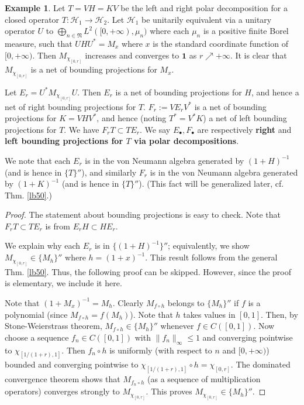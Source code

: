 \documentclass[12pt,b5paper,notitlepage]{article}
\theoremstyle{definition}
\newtheorem{eg}[df]{Example}
\theoremstyle{plain}
\newcommand{\fk}{\mathfrak}
\newcommand{\mc}{\mathcal}
\newcommand{\idt}{\mathbf{1}}
\newcommand{\blt}{\bullet}
\numberwithin{equation}{section}
\begin{document}
\begin{eg}\label{lb37}
Let $T=VH=KV$ be the left and right polar decomposition for a closed operator $T:\mc H_1\rightarrow\mc H_2$. Let $\mc H_1$ be unitarily equivalent via a unitary operator $U$ to $\bigoplus_{n\in\fk N}L^2([0,+\infty),\mu_n)$ where each $\mu_n$ is a positive finite  Borel measure, such that $UHU^*=M_x$ where $x$ is the standard coordinate function of $[0,+\infty)$.  Then $M_{\chi_{[0,r]}}$ increases and converges to $\idt$ as $r\nearrow+\infty$. It is clear that $M_{\chi_{[0,r]}}$ is a net of bounding projections for $M_x$.  

Let $E_r=U^*M_{\chi_{[0,r]}}U$. Then $E_r$ is a net of bounding projections for $H$, and hence a net of right bounding projections for $T$. $F_r:=VE_rV^*$ is a net of bounding projections for $K=VHV^*$, and hence (noting $T^*=V^*K$) a net of left bounding projections for $T$. We have $F_rT\subset TE_r$. We say $E_\blt,F_\blt$ are respectively \textbf{right} and \textbf{left bounding projections for $T$ via polar decompositions}.  

We note that each $E_r$ is in the von Neumann algebra generated by $(1+H)^{-1}$ (and is hence in $\{T\}''$), and similarly $F_r$ is in the von Neumann algebra generated by $(1+K)^{-1}$ (and is hence in $\{T\}''$). (This fact will be generalized later, cf. Thm. \ref{lb50}.)
\end{eg}


\begin{proof}
The statement about bounding projections is easy to check. Note that $F_rT\subset TE_r$ is from $E_rH\subset HE_r$.
	
We explain why each $E_r$ is in $\{(1+H)^{-1}\}''$; equivalently, we show $M_{\chi_{[0,r]}}\in\{M_h\}''$ where $h=(1+x)^{-1}$. This result follows from the general Thm. \ref{lb50}. Thus, the following proof can be skipped. However, since the proof is elementary, we include it here.

Note that $(1+M_x)^{-1}=M_h$. Clearly $M_{f\circ h}$ belongs to $\{M_h\}''$ if $f$ is a polynomial (since $M_{f\circ h}=f(M_h)$). Note that $h$ takes values in $[0,1]$. Then, by Stone-Weierstrass theorem,  $M_{f\circ h}\in\{M_h\}''$ whenever $f\in C([0,1])$. Now choose a sequence $f_n\in C([0,1])$ with $\lVert f_n\lVert_\infty\leq1$ and converging pointwise to $\chi_{[1/(1+r),1]}$. Then $f_n\circ h$ is uniformly (with respect to $n$ and $[0,+\infty)$) bounded and converging pointwise  to $\chi_{[1/(1+r),1]}\circ h=\chi_{[0,r]}$. The dominated convergence theorem shows that $M_{f_n\circ h}$ (as a sequence of multiplication operators) converges strongly to $M_{\chi_{[0,r]}}$. This proves $M_{\chi_{[0,r]}}\in\{M_h\}''$.
\end{proof}
\end{document}
